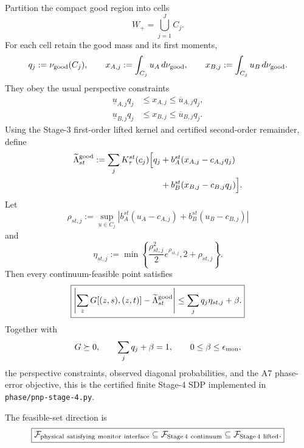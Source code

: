 \documentclass[11pt]{article}
\theoremstyle{remark}
\begin{document}
Partition the compact good region into cells
\[
    W_+
    =
    \bigcup_{j=1}^{J}C_j.
\]
For each cell retain the good mass and its first moments,
\begin{equation}
    q_j
    :=
    \nu_{\rm good}(C_j),
    \qquad
    x_{A,j}
    :=
    \int_{C_j}u_A\,d\nu_{\rm good},
    \qquad
    x_{B,j}
    :=
    \int_{C_j}u_B\,d\nu_{\rm good}.
    \label{eq:stage4-cell-vars}
\end{equation}
They obey the usual perspective constraints
\begin{align}
    \underline u_{A,j}q_j
    &\le x_{A,j}\le\overline u_{A,j}q_j,
    \\
    \underline u_{B,j}q_j
    &\le x_{B,j}\le\overline u_{B,j}q_j.
    \label{eq:stage4-cell-perspective}
\end{align}
Using the Stage-3 first-order lifted kernel and certified second-order
remainder, define
\begin{align}
    \widetilde\Lambda_{st}^{\rm good}
    :=
    \sum_j
    K_\tau^{st}(c_j)
    \Big[
      q_j
      &+
      b_A^{st}(x_{A,j}-c_{A,j}q_j)
      \nonumber\\
      &+
      b_B^{st}(x_{B,j}-c_{B,j}q_j)
    \Big].
    \label{eq:stage4-lifted-overlap}
\end{align}
Let
\begin{equation}
    \rho_{st,j}
    :=
    \sup_{u\in C_j}
    \left|
      b_A^{st}(u_A-c_{A,j})
      +
      b_B^{st}(u_B-c_{B,j})
    \right|
\end{equation}
and
\begin{equation}
    \eta_{st,j}
    :=
    \min\!\left\{
      \frac{\rho_{st,j}^2}{2}e^{\rho_{st,j}},
      2+\rho_{st,j}
    \right\}.
\end{equation}
Then every continuum-feasible point satisfies
\begin{equation}
    \boxed{
    \left|
      \sum_zG[(z,s),(z,t)]
      -
      \widetilde\Lambda_{st}^{\rm good}
    \right|
    \le
    \sum_jq_j\eta_{st,j}
    +
    \beta.
    }
    \label{eq:stage4-certified-soc}
\end{equation}
Together with
\[
    G\succeq0,
    \qquad
    \sum_jq_j+\beta=1,
    \qquad
    0\le\beta\le\epsilon_{\rm mon},
\]
the perspective constraints, observed diagonal probabilities, and the A7
phase-error objective, this is the certified finite Stage-4 SDP implemented in
\texttt{phase/pnp-stage-4.py}.

The feasible-set direction is
\begin{equation}
    \boxed{
    \mathcal F_{\rm physical\ satisfying\ monitor\ interface}
    \subseteq
    \mathcal F_{\rm Stage\,4\ continuum}
    \subseteq
    \mathcal F_{\rm Stage\,4\ lifted}.
    }
    \label{eq:stage4-feasible-chain}
\end{equation}
\end{document}
